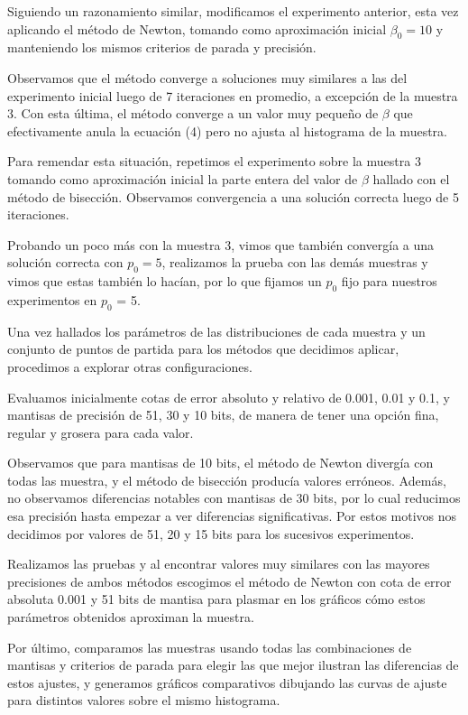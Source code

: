 \documentclass[a4paper,10pt,twoside]{article}
\begin{document}
Siguiendo un razonamiento similar, modificamos el experimento anterior,
esta vez aplicando el método de Newton, tomando como aproximación inicial
$\beta_0 = 10$ y manteniendo los mismos criterios de parada y precisión.

Observamos que el método converge a soluciones muy similares a las del
experimento inicial luego de 7 iteraciones en promedio, a excepción de la
muestra 3. Con esta última, el método converge a un valor muy pequeño de
$\beta$ que efectivamente anula la ecuación (4) pero no ajusta al histograma
de la muestra.

Para remendar esta situación, repetimos el experimento sobre la muestra 3
tomando como aproximación inicial la parte entera del valor de $\beta$ hallado
con el método de bisección. Observamos convergencia a una solución correcta
luego de 5 iteraciones.

Probando un poco más con la muestra 3, vimos que también convergía a una
solución correcta con $p_0 = 5$, realizamos la prueba con las demás muestras
y vimos que estas también lo hacían, por lo que fijamos un $p_0$ fijo para
nuestros experimentos en $p_0$ = 5.

Una vez hallados los parámetros de las distribuciones de cada muestra y un
conjunto de puntos de partida para los métodos que decidimos aplicar,
procedimos a explorar otras configuraciones. 

Evaluamos inicialmente cotas de error absoluto y relativo de 0.001, 0.01 y 0.1, y mantisas
de precisión de 51, 30 y 10 bits, de manera de tener una opción fina, regular y
grosera para cada valor.

Observamos que para mantisas de 10 bits, el método de Newton divergía con todas
las muestra, y el método de bisección producía valores erróneos. Además,
no observamos diferencias notables con mantisas de 30 bits, por lo cual reducimos
esa precisión hasta empezar a ver diferencias significativas. Por estos motivos
nos decidimos por valores de 51, 20 y 15 bits para los sucesivos experimentos.

Realizamos las pruebas y al encontrar valores muy similares con las mayores precisiones
de ambos métodos escogimos el método de Newton con cota de error absoluta 0.001 y 51 bits de mantisa
para plasmar en los gráficos cómo estos parámetros obtenidos aproximan la muestra.

Por último, comparamos las muestras usando todas las combinaciones de mantisas y criterios
de parada para elegir las que mejor ilustran las diferencias de estos ajustes, y
generamos gráficos comparativos dibujando las curvas de ajuste para distintos valores
sobre el mismo histograma.
\end{document}
